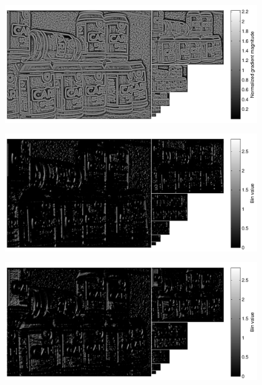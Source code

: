\documentclass[thesis.tex]{subfiles}
\begin{document}
%
\begin{figure}[H]
    \centering
    \includegraphics[width=\textwidth]{img/cellHistScaleSpacesMnorm.pdf}
    \caption{}
    \label{fig:cellHistScaleSpacesMnorm}
\end{figure}
%
\begin{figure}[H]
    \centering
    \includegraphics[width=\textwidth]{img/cellHistScaleSpacesBin01.pdf}
    \caption{}
    \label{fig:cellHistScaleSpacesBin01}
\end{figure}
%
\begin{figure}[H]
    \centering
    \includegraphics[width=\textwidth]{img/cellHistScaleSpacesBin07.pdf}
    \caption{}
    \label{fig:cellHistScaleSpacesBin07}
\end{figure}
%
\end{document}
